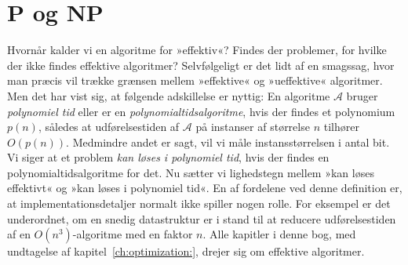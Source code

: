 \section{P og NP}

%
%
%

Hvornår kalder vi en  algoritme for »effektiv«?
Findes der problemer, for hvilke der ikke findes effektive algoritmer?
Selvfølgeligt er det lidt af en smagssag, hvor man præcis vil trække grænsen mellem »effektive« og »ueffektive« algoritmer.
Men det har vist sig, at følgende adskillelse er nyttig:
En algoritme $\mathcal{A}$ bruger \emph{polynomiel tid} eller er en  \emph{polynomialtidsalgoritme},
hvis der findes et polynomium $p(n)$, således at udførelsestiden  af $\mathcal{A}$ på instanser af størrelse $n$ tilhører $O(p(n))$. 
Medmindre andet er sagt, vil vi måle instansstørrelsen i antal bit.
Vi siger at et problem \emph{kan løses i polynomiel tid}, hvis der findes en polynomialtidsalgoritme for det.
Nu sætter vi lighedstegn mellem »kan løses effektivt« og »kan løses i polynomiel tid«. 
En af fordelene ved denne definition er, at implementationsdetaljer normalt ikke spiller nogen rolle.
For eksempel er det underordnet, om en snedig datastruktur er i stand til at reducere udførelsestiden af en $O(n^3)$-algoritme med en faktor $n$.
Alle kapitler i denne bog, med undtagelse af kapitel~\ref{ch:optimization:}, drejer sig om effektive algoritmer.
  
